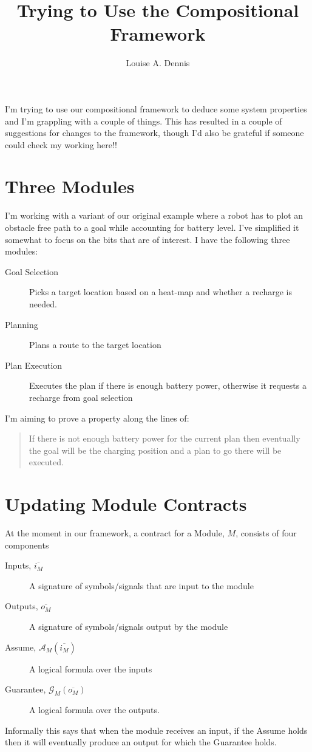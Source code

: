\documentclass{blue-book}
\title{Trying to Use the Compositional Framework}
\author{Louise A. Dennis}
\begin{document}
\maketitle
I'm trying to use our compositional framework to deduce some system properties and I'm grappling with a couple of things.  This has resulted in a couple of suggestions for changes to the framework, though I'd also be grateful if someone could check my working here!!

\section{Three Modules}
I'm working with a variant of our original example where a robot has to plot an obstacle free path to a goal while accounting for battery level.   I've simplified it somewhat to focus on the bits that are of interest.  I have the following three modules:

\begin{description}
\item[Goal Selection] Picks a target location based on a heat-map and whether a recharge is needed.
\item[Planning] Plans a route to the target location
\item[Plan Execution] Executes the plan if there is enough battery power, otherwise it requests a recharge from goal selection
\end{description}

I'm aiming to prove a property along the lines of:
\begin{quote}
If there is not enough battery power for the current plan then eventually the goal will be the charging position and a plan to go there will be executed.
\end{quote}

\section{Updating Module Contracts}

At the moment in our framework, a contract for a Module, $M$, consists of four components
\begin{description}
\item[Inputs, $\overline{i_M}$] A signature of symbols/signals that are input to the module
\item[Outputs, $\overline{o_M}$] A signature of symbols/signals output by the module
\item[Assume, $\mathcal{A}_M(\overline{i_M})$] A logical formula over the inputs
\item[Guarantee, $\mathcal{G}_M(\overline{o_M})$] A logical formula over the outputs.
\end{description}
Informally this says that when the module receives an input, if the Assume holds then it will eventually produce an output for which the Guarantee holds.
\end{document}

